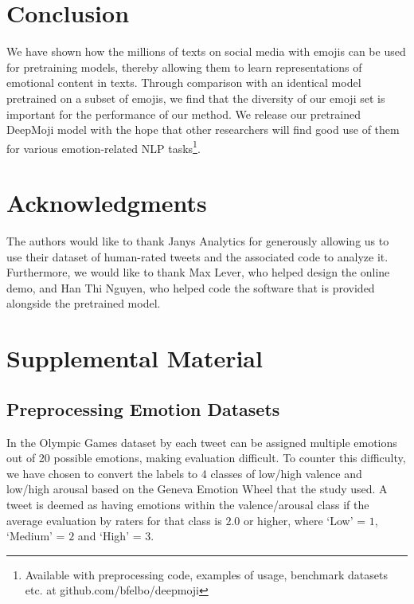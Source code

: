 \documentclass[11pt,a4paper]{article}
\begin{document}
\section{Conclusion}
\label{sec:discussion}

We have shown how the millions of texts on social media with emojis can be used for pretraining models, thereby allowing them to learn representations of emotional content in texts. Through comparison with an identical model pretrained on a subset of emojis, we find that the diversity of our emoji set is important for the performance of our method. We release our pretrained DeepMoji model with the hope that other researchers will find good use of them for various emotion-related NLP tasks\footnote{Available with preprocessing code, examples of usage, benchmark datasets etc. at github.com/bfelbo/deepmoji}.


\section*{Acknowledgments}

The authors would like to thank Janys Analytics for generously allowing us to use their dataset of human-rated tweets and the associated code to analyze it. Furthermore, we would like to thank Max Lever, who helped design the online demo, and Han Thi Nguyen, who helped code the software that is provided alongside the pretrained model.




\appendix

\section{Supplemental Material}
\label{sec:supplemental}

\subsection{Preprocessing Emotion Datasets}
\label{sub_sec:supp_emotion_dsets}

In the Olympic Games dataset by \citeauthor{sintsova2013fine} each tweet can be assigned multiple emotions out of 20 possible emotions, making evaluation difficult. To counter this difficulty, we have chosen to convert the labels to 4 classes of low/high valence and low/high arousal based on the Geneva Emotion Wheel that the study used. A tweet is deemed as having emotions within the valence/arousal class if the average evaluation by raters for that class is $2.0$ or higher, where `Low' = $1$, `Medium' = $2$ and `High' = $3$.
\end{document}
